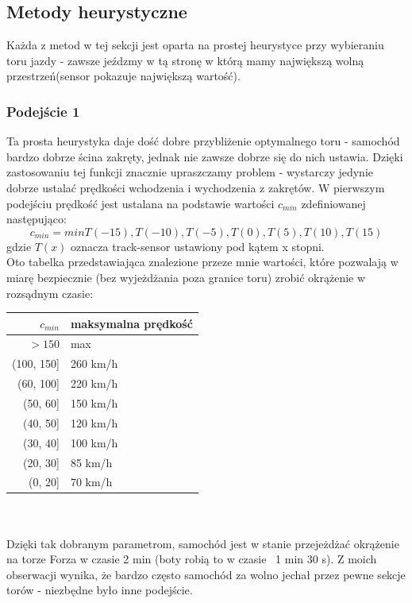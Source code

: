 \documentclass{article}
\begin{document}
\subsection{Metody heurystyczne}
Każda z metod w tej sekcji jest oparta na prostej heurystyce przy wybieraniu toru jazdy - zawsze jeźdzmy w tą stronę w którą mamy największą wolną przestrzeń(sensor pokazuje największą wartość).
\subsubsection{Podejście 1}

Ta prosta heurystyka daje dość dobre przybliżenie optymalnego toru - samochód bardzo dobrze ścina zakręty, jednak nie zawsze dobrze się do nich ustawia.
Dzięki zastosowaniu tej funkcji znacznie upraszczamy problem - wystarczy jedynie dobrze ustalać prędkości wchodzenia i wychodzenia z zakrętów. W pierwszym podejściu prędkość jest ustalana na podstawie wartości \(c_{min}\) zdefiniowanej następująco:\\
\[c_{min} = min { T(-15), T(-10), T(-5), T(0), T(5), T(10), T(15)} \]
gdzie \(T(x)\) oznacza track-sensor ustawiony pod kątem x stopni.\\
Oto tabelka przedstawiająca znalezione przeze mnie wartości, które pozwalają w miarę bezpiecznie (bez wyjeżdżania poza granice toru) zrobić okrążenie w rozsądnym czasie:

\begin{tabular}{|r|l|} \hline
\(c_{min}\) & maksymalna prędkość\\
\hline 
\(>150\)    & max \\
(100, 150] & 260 km/h \\
(60, 100] & 220 km/h \\
(50, 60] & 150 km/h \\
(40, 50] & 120 km/h \\
(30, 40] & 100 km/h \\
(20, 30] & 85 km/h \\
(0, 20] & 70 km/h \\
\hline 
\end{tabular}\\\\
Dzięki tak dobranym parametrom, samochód jest w stanie przejeżdżać okrążenie na torze Forza w czasie 2 min (boty robią to w czasie ~1 min 30 s). Z moich obserwacji wynika, że bardzo często samochód za wolno jechał przez pewne sekcje torów - niezbędne było inne podejście.
\end{document}
